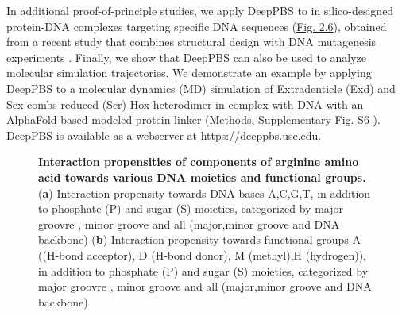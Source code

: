 \par
In additional proof-of-principle studies, we apply DeepPBS to in silico-designed protein-DNA complexes targeting specific DNA sequences (\hyperref[fig:pdna5]{Fig. 2.6}), obtained from a recent study that combines structural design with DNA mutagenesis experiments \citep{Glasscock2023}. Finally, we show that DeepPBS can also be used to analyze molecular simulation trajectories. We demonstrate an example by applying DeepPBS to a molecular dynamics (MD) simulation of Extradenticle (Exd) and Sex combs reduced (Scr) Hox heterodimer in complex with DNA \citep{Joshi2007} with an AlphaFold-based modeled protein linker (Methods, Supplementary \hyperref[fig:pdnaS5]{Fig. S6} ). DeepPBS is available as a webserver at \url{https://deeppbs.usc.edu}.
\par
\begin{center}
    \begin{figure}
        \caption[Interaction propensities of components of arginine amino acid towards various DNA moieties and functional groups]{\textbf{ Interaction propensities of components of arginine amino acid towards various DNA moieties and functional groups.} ({\bf a}) Interaction  propensity towards DNA bases 	A,C,G,T, in addition to phosphate (P) and sugar (S) moieties, categorized by major groovre , minor groove and all (major,minor groove and DNA backbone) ({\bf b}) Interaction  propensity towards functional groups \citep{Chiu2023} A ((H-bond acceptor), D (H-bond donor), M (methyl),H (hydrogen)), in addition to phosphate (P) and sugar (S) moieties, categorized by major groovre , minor groove and all (major,minor groove and DNA backbone)}
  \label{fig:arg}
\end{figure}
\end{center}